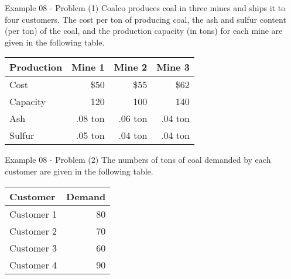 \begin{frame}{Example 08 - Problem (1)}
Coalco produces coal in three mines and ships it to four customers.
The cost per ton of producing coal, the ash and sulfur content (per ton) of the
coal, and the production capacity (in tons) for each mine are given in the
following table.

\begin{center}
\begin{tabular}{lrrr}
\hline
  \cellcolor{gray90}\textbf{Production}
& \cellcolor{gray90}\textbf{Mine 1}
& \cellcolor{gray90}\textbf{Mine 2}
& \cellcolor{gray90}\textbf{Mine 3} \\
\hline
Cost     & \$50    & \$55    & \$62 \\
Capacity &  120    &  100    &  140 \\
Ash      & .08 ton & .06 ton & .04 ton \\
Sulfur   & .05 ton & .04 ton & .04 ton \\
\hline
\end{tabular}
\end{center}

\end{frame}

\begin{frame}{Example 08 - Problem (2)}
The numbers of tons of coal demanded by each customer are given in the following
table.

\begin{center}
\begin{tabular}{lr}
\hline
  \cellcolor{gray90}\textbf{Customer}
& \cellcolor{gray90}\textbf{Demand} \\
\hline
Customer 1 & 80 \\
Customer 2 & 70 \\
Customer 3 & 60 \\
Customer 4 & 90 \\
\hline
\end{tabular}
\end{center}

\end{frame}


